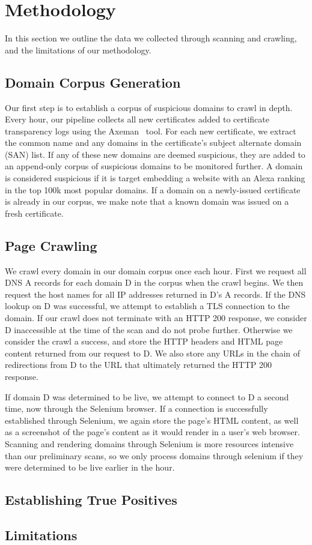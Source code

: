 \section{Methodology}
\label{sec:methodology}

In this section we outline the data we collected through scanning and
crawling, and the limitations of our methodology. 


\subsection{Domain Corpus Generation}
\label{methodology:corpus}

Our first step is to establish a corpus of suspicious domains to crawl in
depth.
%
Every hour, our pipeline collects all new certificates added to certificate
transparency logs using the Axeman~ tool.
%
For each new certificate, we extract the common name and any domains in the
certificate's subject alternate domain (SAN) list.
%
If any of these new domains are deemed suspicious, they are added to an
append-only corpus of suspicious domains to be monitored further.
%
A domain is considered suspicious if it is target embedding a website with an
Alexa ranking in the top 100k most popular domains.
%
If a domain on a newly-issued certificate is already in our corpus, we make 
note that a known domain was issued on a fresh certificate.


\subsection{Page Crawling}
\label{methodology:crawl}

We crawl every domain in our domain corpus once each hour.
%
First we request all DNS A records for each domain D in the corpus when the
crawl begins.
%
We then request the host names for all IP addresses returned in D's A
records.
%
If the DNS lookup on D was successful, we attempt to establish a TLS connection
to the domain.
%
If our crawl does not terminate with an HTTP 200 response, we consider
D inaccessible at the time of the scan and do not probe further.
%
Otherwise we consider the crawl a success, and store the HTTP headers and
HTML page content returned from our request to D.
%
We also store any URLs in the chain of redirections from D to the URL that
ultimately returned the HTTP 200 response.


If domain D was determined to be live, we attempt to connect to D a second
time, now through the Selenium  browser.
%
If a connection is successfully established through Selenium, we again store
the page's HTML content, as well as a screenshot of the page's content as it
would render in a user's web browser.
%
Scanning and rendering domains through Selenium is more resources intensive
than our preliminary scans, so we only process domains through selenium
if they were determined to be live earlier in the hour.


\subsection{Establishing True Positives}
\label{methodology:positives}




\subsection{Limitations}
\label{methodology:limitations}



